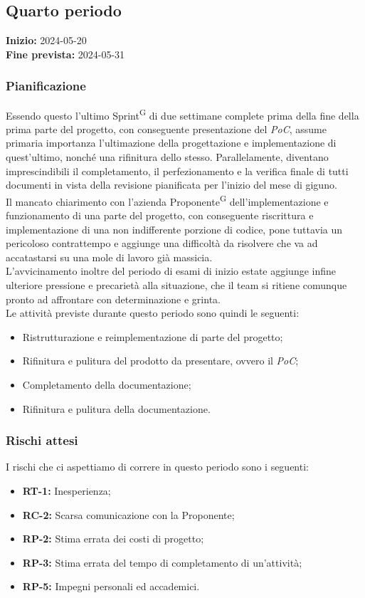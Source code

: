 \documentclass[8pt]{article}
\newcommand{\glossterm}[1]{#1\textsuperscript{G}} %
\begin{document}
\subsection{Quarto periodo} \label{sec:4_rtb}
\textbf{Inizio:} 2024-05-20\\
\textbf{Fine prevista:} 2024-05-31
\subsubsection{Pianificazione}
Essendo questo l'ultimo \glossterm{Sprint} di due settimane complete prima della fine della prima parte del progetto,
con conseguente presentazione del \textit{PoC}, assume primaria importanza l'ultimazione della progettazione
e implementazione di quest'ultimo, nonché una rifinitura dello stesso. Parallelamente, diventano imprescindibili
il completamento, il perfezionamento e la verifica finale di tutti documenti in vista della revisione pianificata
per l'inizio del mese di giguno. \\
Il mancato chiarimento con l'azienda \glossterm{Proponente} dell'implementazione e funzionamento di una parte del progetto,
con conseguente riscrittura e implementazione di una non indifferente porzione di codice, pone tuttavia un pericoloso
contrattempo e aggiunge una difficoltà da risolvere che va ad accatastarsi su una mole di lavoro già massicia. \\
L'avvicinamento inoltre del periodo di esami di inizio estate aggiunge infine ulteriore pressione e precarietà
alla situazione, che il team si ritiene comunque pronto ad affrontare con determinazione e grinta.\\
Le attività previste durante questo periodo sono quindi le seguenti:
\begin{itemize}
\setlength{\itemsep}{0em}
    \item Ristrutturazione e reimplementazione di parte del progetto;
    \item Rifinitura e pulitura del prodotto da presentare, ovvero il \textit{PoC};
    \item Completamento della documentazione;
    \item Rifinitura e pulitura della documentazione.
\end{itemize}
\subsubsection{Rischi attesi}
I rischi che ci aspettiamo di correre in questo periodo sono i seguenti: 
\begin{itemize}
\setlength{\itemsep}{0em}
    \item \textbf{RT-1:} Inesperienza;  
    \item \textbf{RC-2:} Scarsa comunicazione con la Proponente;
    \item \textbf{RP-2:} Stima errata dei costi di progetto;
    \item \textbf{RP-3:} Stima errata del tempo di completamento di un'attività;
    \item \textbf{RP-5:} Impegni personali ed accademici.
\end{itemize}
\clearpage
\end{document}
